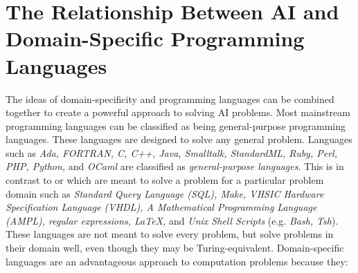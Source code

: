 \section{The Relationship Between AI and Domain-Specific Programming Languages}
The ideas of domain-specificity and programming languages can be combined together to create a powerful approach to solving AI problems. Most mainstream programming languages can be classified as being general-purpose programming languages. These languages are designed to solve any general problem. Languages such as \textit{Ada, FORTRAN, C, C++, Java, Smalltalk, StandardML, Ruby, Perl, PHP, Python,} and \textit{OCaml} are classified as \textit{general-purpose languages}. This is in contrast to  or  which are meant to solve a problem for a particular problem domain such as \textit{Standard Query Language (SQL), Make, VHSIC Hardware Specification Language (VHDL), A Mathematical Programming Language (AMPL), regular expressions, LaTeX,} and \textit{Unix Shell Scripts} (e.g. \textit{Bash, Tsh}). These languages are not meant to solve every problem, but solve problems in their domain well, even though they may be Turing-equivalent.
Domain-specific languages are an advantageous approach to computation problems because they:
